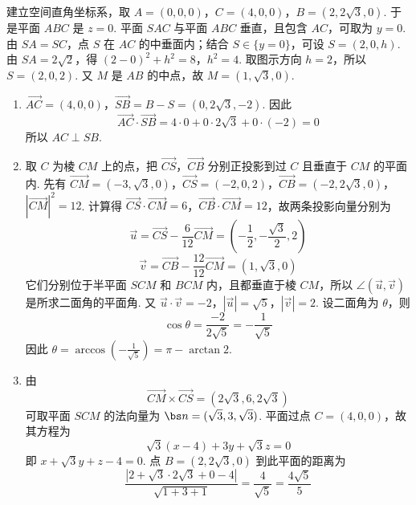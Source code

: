 \begin{solution}
建立空间直角坐标系，取
\(A=(0,0,0)\)，\(C=(4,0,0)\)，\(B=(2,2\sqrt3,0)\).
于是平面 \(ABC\) 是 \(z=0\). 平面 \(SAC\) 与平面 \(ABC\) 垂直，且包含 \(AC\)，可取为 \(y=0\). 由 \(SA=SC\)，点 \(S\) 在 \(AC\) 的中垂面内；结合 \(S\in\{y=0\}\)，可设 \(S=(2,0,h)\). 由 \(SA=2\sqrt2\)，得
\((2-0)^2+h^2=8\)，\(h^2=4\).
取图示方向 \(h=2\)，所以 \(S=(2,0,2)\). 又 \(M\) 是 \(AB\) 的中点，故 \(M=(1,\sqrt3,0)\).

\begin{enumerate}
\item \(\overrightarrow{AC}=(4,0,0)\)，\(\overrightarrow{SB}=B-S=(0,2\sqrt3,-2)\). 因此
\[
\overrightarrow{AC}\cdot\overrightarrow{SB}=4\cdot0+0\cdot2\sqrt3+0\cdot(-2)=0
\]
所以 \(AC\perp SB\).
\item 取 \(C\) 为棱 \(CM\) 上的点，把 \(\overrightarrow{CS}\)，\(\overrightarrow{CB}\) 分别正投影到过 \(C\) 且垂直于 \(CM\) 的平面内. 先有
\(\overrightarrow{CM}=(-3,\sqrt3,0)\)，\(\overrightarrow{CS}=(-2,0,2)\)，\(\overrightarrow{CB}=(-2,2\sqrt3,0)\)，\(|\overrightarrow{CM}|^2=12\).
计算得 \(\overrightarrow{CS}\cdot\overrightarrow{CM}=6\)，\(\overrightarrow{CB}\cdot\overrightarrow{CM}=12\)，故两条投影向量分别为
\[
\overrightarrow{u}=\overrightarrow{CS}-\frac6{12}\overrightarrow{CM}
=\left(-\frac12,-\frac{\sqrt3}{2},2\right)
\]
\[
\overrightarrow{v}=\overrightarrow{CB}-\frac{12}{12}\overrightarrow{CM}
=(1,\sqrt3,0)
\]
它们分别位于半平面 \(SCM\) 和 \(BCM\) 内，且都垂直于棱 \(CM\)，所以 \(\angle(\overrightarrow u,\overrightarrow v)\) 是所求二面角的平面角. 又
\(\overrightarrow u\cdot\overrightarrow v=-2\)，\(|\overrightarrow u|=\sqrt5\)，\(|\overrightarrow v|=2\).
设二面角为 \(\theta\)，则
\[
\cos\theta=\frac{-2}{2\sqrt5}=-\frac1{\sqrt5}
\]
因此 \(\theta=\arccos\left(-\frac1{\sqrt5}\right)=\pi-\arctan 2\).
\item 由
\[
\overrightarrow{CM}\times\overrightarrow{CS}=(2\sqrt3,6,2\sqrt3)
\]
可取平面 \(SCM\) 的法向量为 \(\bs n=(\sqrt3,3,\sqrt3)\). 平面过点 \(C=(4,0,0)\)，故其方程为
\[
\sqrt3(x-4)+3y+\sqrt3z=0
\]
即 \(x+\sqrt3y+z-4=0\). 点 \(B=(2,2\sqrt3,0)\) 到此平面的距离为
\[
\frac{|2+\sqrt3\cdot2\sqrt3+0-4|}{\sqrt{1+3+1}}
=\frac4{\sqrt5}=\frac{4\sqrt5}{5}
\]
\end{enumerate}
\end{solution}


